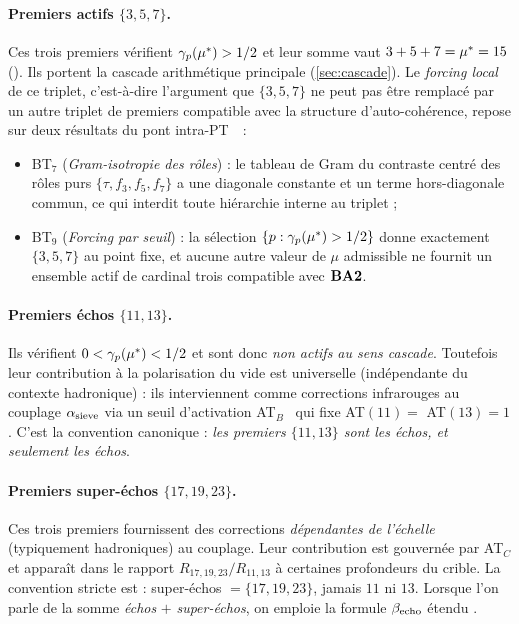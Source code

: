 \paragraph{Premiers actifs $\{3, 5, 7\}$.}
Ces trois premiers vérifient $\gamma_{p}(\mu^{*}) > 1/2$ et leur somme vaut $3 + 5 + 7 = \mu^{*} = 15$ (\Tfive). Ils portent la cascade arithmétique principale (\ref{sec:cascade}). Le \emph{forcing local} de ce triplet, c'est-à-dire l'argument que $\{3, 5, 7\}$ ne peut pas être remplacé par un autre triplet de premiers compatible avec la structure d'auto-cohérence, repose sur deux résultats du pont intra-PT~\cite{PT_NewMath_BT}~:
\begin{itemize}[nosep,leftmargin=*]
\item BT$_7$ (\emph{Gram-isotropie des rôles}) : le tableau de Gram du contraste centré des rôles purs $\{\tau, f_3, f_5, f_7\}$ a une diagonale constante et un terme hors-diagonale commun, ce qui interdit toute hiérarchie interne au triplet ;
\item BT$_9$ (\emph{Forcing par seuil}) : la sélection $\{p : \gamma_{p}(\mu^{*}) > 1/2\}$ donne exactement $\{3, 5, 7\}$ au point fixe, et aucune autre valeur de $\mu$ admissible ne fournit un ensemble actif de cardinal trois compatible avec $\textbf{BA2}$.
\end{itemize}

\paragraph{Premiers échos $\{11, 13\}$.}
Ils vérifient $0 < \gamma_{p}(\mu^{*}) < 1/2$ et sont donc \emph{non actifs au sens cascade}. Toutefois leur contribution à la polarisation du vide est universelle (indépendante du contexte hadronique) : ils interviennent comme corrections infrarouges au couplage $\alpha_{\rm sieve}$ via un seuil d'activation AT$_B$~\cite[ch.~PM]{PT_Monograph} qui fixe AT$(11) = $ AT$(13) = 1$. C'est la convention canonique : \emph{les premiers $\{11, 13\}$ sont les échos, et seulement les échos}.

\paragraph{Premiers super-échos $\{17, 19, 23\}$.}
Ces trois premiers fournissent des corrections \emph{dépendantes de l'échelle} (typiquement hadroniques) au couplage. Leur contribution est gouvernée par AT$_C$ et apparaît dans le rapport $R_{17,19,23}/R_{11,13}$ à certaines profondeurs du crible. La convention stricte est : super-échos $= \{17, 19, 23\}$, jamais $11$ ni $13$. Lorsque l'on parle de la somme \emph{échos} $+$ \emph{super-échos}, on emploie la formule \og $\beta_{\rm echo}$ étendu \fg.

